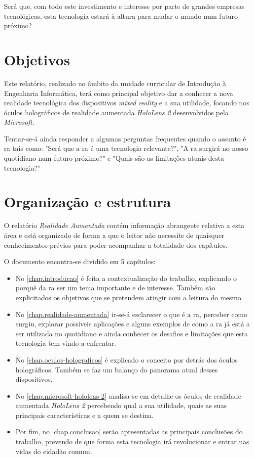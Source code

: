 \documentclass{report}
\begin{document}
Será que, com todo este investimento e interesse por parte de grandes empresas tecnológicas, esta tecnologia estará à altura para mudar o mundo num futuro próximo?

\section{Objetivos}
Este relatório, realizado no âmbito da unidade curricular de Introdução à Engenharia Informática, terá como principal objetivo dar a conhecer a nova realidade tecnológica dos dispositivos \textit{mixed reality} e a sua utilidade, focando nos óculos holográficos de realidade aumentada \textit{HoloLens 2} desenvolvidos pela \textit{Microsoft}.

Tentar-se-á ainda responder a algumas perguntas frequentes quando o assunto é \ac{ra} tais como: "Será que a \ac{ra} é uma tecnologia relevante?", "A \ac{ra} surgirá no nosso quotidiano num futuro próximo?" e "Quais são as limitações atuais desta tecnologia?"

\section{Organização e estrutura}
O relatório \textit{Realidade Aumentada} contém informação abrangente relativa a esta área e está organizado de forma a que o leitor não necessite de quaisquer conhecimentos prévios para poder acompanhar a totalidade dos capítulos.

O documento encontra-se dividido em 5 capítulos:
\begin{itemize}
    \item No \autoref{chap.introducao} é feita a contextualização do trabalho, explicando o porquê da \ac{ra} ser um tema importante e de interesse. Também são explicitados os objetivos que se pretendem atingir com a leitura do mesmo.
    \item No \autoref{chap.realidade-aumentada} ir-se-á esclarecer o que é a \ac{ra}, perceber como surgiu, explorar possíveis aplicações e alguns exemplos de como a \ac{ra} já está a ser utilizada no quotidiano e ainda conhecer os desafios e limitações que esta tecnologia tem vindo a enfrentar.
    \item No \autoref{chap.oculos-holograficos} é explicado o conceito por detrás dos óculos holográficos. Também se faz um balanço do panorama atual desses dispositivos.
    \item No \autoref{chap.microsoft-hololens-2} analisa-se em detalhe os óculos de realidade aumentada \textit{HoloLens 2} percebendo qual a sua utilidade, quais as suas principais características e a quem se destina.
    \item Por fim, no \autoref{chap.conclusao} serão apresentadas as principais conclusões do trabalho, prevendo de que forma esta tecnologia irá revolucionar e entrar nas vidas do cidadão comum.
\end{itemize}
\end{document}
